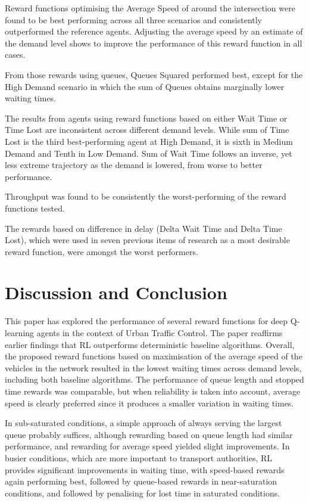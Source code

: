 \documentclass[conference]{IEEEtran}
\begin{document}
Reward functions optimising the Average Speed of around the intersection were found to be best performing across all three scenarios and consistently outperformed the reference agents.
Adjusting the average speed by an estimate of the demand level shows to improve the performance of this reward function in all cases.

From those rewards using queues, Queues Squared performed best, except for the High Demand scenario in which the sum of Queues obtains marginally lower waiting times.

The results from agents using reward functions based on either Wait Time or Time Lost are inconsistent across different demand levels.
While sum of Time Lost is the third best-performing agent at High Demand, it is sixth in Medium Demand and Tenth in Low Demand.
Sum of Wait Time follows an inverse, yet less extreme trajectory as the demand is lowered, from worse to better performance.

Throughput was found to be consistently the worst-performing of the reward functions tested.

The rewards based on difference in delay (Delta Wait Time and Delta Time Lost), which were used in seven previous items of research as a most desirable reward function, were amongst the worst performers.


\section{Discussion and Conclusion}
This paper has explored the performance of several reward functions for deep Q-learning agents in the context of Urban Traffic Control. The paper reaffirms earlier findings that RL outperforms deterministic baseline algorithms.
Overall, the proposed reward functions based on maximisation of the average speed of the vehicles in the network resulted in the lowest waiting times across demand levels, including both baseline algorithms.
The performance of queue length and stopped time rewards was comparable, but when reliability is taken into account, average speed is clearly preferred since it produces a smaller variation in waiting times.

In sub-saturated conditions, a simple approach of always serving the largest queue probably suffices, although rewarding based on queue length had similar performance, and rewarding for average speed yielded slight improvements.
In busier conditions, which are more important to transport authorities, RL provides significant improvements in waiting time, with speed-based rewards again performing best, followed by queue-based rewards in near-saturation conditions, and followed by penalising for lost time in saturated conditions.
\end{document}
